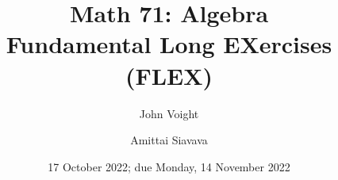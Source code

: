 \documentclass[11pt, reqno]{amsart}
\begin{document}
\setlength{\headheight}{13.0pt}
\setlength{\footskip}{13.0pt}

\title{Math 71: Algebra \\ Fundamental Long EXercises (FLEX)}
\author{John Voight \and Amittai Siavava}
\date{17 October 2022; due Monday, 14 November 2022}
\maketitle



\vfill\newpage


\vfill\newpage


\vfill\newpage

\end{document}

